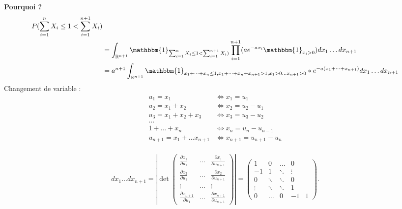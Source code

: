 \documentclass{article}
\theoremstyle{plain}%
\theoremstyle{definition}
\theoremstyle{remark}
\begin{document}
\textbf{Pourquoi ?} \\
\begin{align*}
	P(\sum_{i=1}^{n}X_i \leq 1 < \sum_{i=1}^{n+1}X_i) & \\
	&= \int_{\mathbb{R}^{n+1}}^{} \mathbbm{1}_{\sum_{i=1}^{n}X_i \leq 1 < \sum_{i=1}^{n+1}X_i)} \prod_{i=1}^{n+1}(ae^{-ax_i} \mathbbm{1}_{x_i > 0}) dx_1 \dots dx_{n+1} \\ 
	&= a^{n+1} \int_{\mathbb{R}^{n+1}} \mathbbm{1}_{x_1 + \dots + x_n \leq 1, x_1 + \dots + x_n + x _{n+1} 
	> 1, x_1 >0 \dots x_{n+1} > 0 } * e^{-a (x_1+ \dots + x_{n+1})} dx_1 \dots dx_{n+1} \\ 
\end{align*}
Changement de variable : 
\begin{align*}
	u_1 = x_1 						&\Leftrightarrow x_1 = u_1\\
	u_2 = x_1 + x_2 				&\Leftrightarrow x_2 = u_2 - u_1\\
	u_3 = x_1 + x_2 + x_3 			&\Leftrightarrow x_3 = u_3 - u_2\\
	\dots 							&\\
	1 + \dots + x_n 				&\Leftrightarrow x_n = u_n - u_{n-1}\\
	u_{n+1} = x_1 + \dots x_{n+1}	&\Leftrightarrow x_{n+1} = u_{n+1} - u_n\\
\end{align*}

\[
	dx_1 \dots dx_{n+1} = \left| \det \begin{pmatrix}
		\frac{\partial x_1}{\partial u_1} & \dots & \frac{\partial x_1}{\partial u_{n+1}} \\
		\frac{\partial x_2}{\partial u_1} & \dots & \frac{\partial x_2}{\partial u_{n+1}} \\
		\vdots & \dots & \vdots  \\
		\frac{\partial x_{n+1}}{\partial u_1} & \dots & \frac{\partial x_{n+1}}{\partial u_{n+1}} 
	\end{pmatrix}
	\right|  = \begin{pmatrix}
	1      & 0      & \dots  & 0          \\
	-1     & 1      & \ddots & \vdots     \\
	0      & \ddots & \ddots & 0          \\
	\vdots & \ddots & \ddots & 1         \\
	0      & \dots  & 0      & -1  & 1  
\end{pmatrix}
.\]
\end{document}
